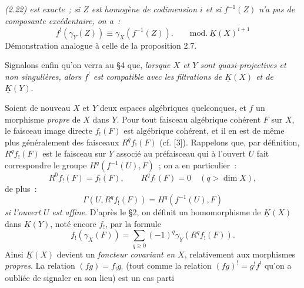 \emph{(2.22) est exacte~; si $Z$ est homogène de codimension $i$ et si $f^{-1}(Z)$ n'a pas de composante excédentaire, on a~:}
\begin{equation}\tag{2.23}
 f^!(\gamma_Y(Z))\equiv\gamma_X(f^{-1}(Z)).\qquad\mathrm{mod.}\ \underline K(X)^{i+1}
\end{equation}
Démonstration analogue à celle de la proposition 2.7.

Signalons enfin qu'on verra au \S 4 que, \emph{lorsque $X$ et $Y$ sont quasi-projectives et non singulières, alors $f^!$ est compatible avec les filtrations de $\underline K(X)$ et de $\underline K(Y)$}.

Soient de nouveau $X$ et $Y$ deux espaces algébriques quelconques, et $f$ un morphisme \emph{propre} de $X$ dans $Y$. Pour tout faisceau algébrique cohérent $F$ sur $X$, le faisceau image directe $f_!(F)$ est algébrique cohérent, et il en est de même plus généralement des faisceaux $R^qf_!(F)$ (cf. [3]). Rappelons que, par définition, $R^qf_!(F)$ est le faisceau sur $Y$ associé au préfaisceau qui à l'ouvert $U$ fait correspondre le groupe $H^q(f^{-1}(U),F)$~; on a en particulier~:
\begin{equation}\tag{2.24}
 R^0f_!(F)=f_!(F),\qquad R^qf_!(F)=0\quad(q>\dim X),
\end{equation}
de plus~:
\begin{equation}\tag{2.25}
 \Gamma(U,R^qf_!(F))=H^q(f^{-1}(U),F)
\end{equation}
\emph{si l'ouvert $U$ est affine}. D'après le \S 2, on définit un homomorphisme de $\underline K(X)$ dans $\underline K(Y)$, noté encore $f_!$, par la formule
\begin{equation}\tag{2.26}
 f_!(\gamma_X(F))=\sum_{q\geq0}(-1)^q\gamma_Y(R^qf_!(F)).
\end{equation}
Ainsi $\underline K(X)$ devient un \emph{foncteur covariant en $X$}, relativement aux morphismes \emph{propres}. La relation $(fg)=f_!g_!$ (tout comme la relation $(fg)^!=g^!f^!$ qu'on a oubliée de signaler en son lieu) est un cas
parti%
